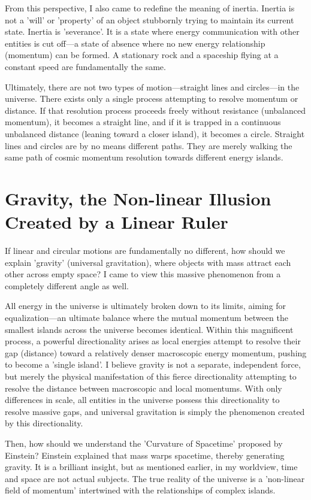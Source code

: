 \documentclass[11pt,a4paper]{article}
\begin{document}
From this perspective, I also came to redefine the meaning of inertia. Inertia is not a 'will' or 'property' of an object stubbornly trying to maintain its current state. Inertia is 'severance'. It is a state where energy communication with other entities is cut off—a state of absence where no new energy relationship (momentum) can be formed. A stationary rock and a spaceship flying at a constant speed are fundamentally the same.

Ultimately, there are not two types of motion—straight lines and circles—in the universe. There exists only a single process attempting to resolve momentum or distance. If that resolution process proceeds freely without resistance (unbalanced momentum), it becomes a straight line, and if it is trapped in a continuous unbalanced distance (leaning toward a closer island), it becomes a circle. Straight lines and circles are by no means different paths. They are merely walking the same path of cosmic momentum resolution towards different energy islands.

\section*{Gravity, the Non-linear Illusion Created by a Linear Ruler}
If linear and circular motions are fundamentally no different, how should we explain 'gravity' (universal gravitation), where objects with mass attract each other across empty space? I came to view this massive phenomenon from a completely different angle as well.

All energy in the universe is ultimately broken down to its limits, aiming for equalization—an ultimate balance where the mutual momentum between the smallest islands across the universe becomes identical. Within this magnificent process, a powerful directionality arises as local energies attempt to resolve their gap (distance) toward a relatively denser macroscopic energy momentum, pushing to become a 'single island'. I believe gravity is not a separate, independent force, but merely the physical manifestation of this fierce directionality attempting to resolve the distance between macroscopic and local momentums. With only differences in scale, all entities in the universe possess this directionality to resolve massive gaps, and universal gravitation is simply the phenomenon created by this directionality.

Then, how should we understand the 'Curvature of Spacetime' proposed by Einstein? Einstein explained that mass warps spacetime, thereby generating gravity. It is a brilliant insight, but as mentioned earlier, in my worldview, time and space are not actual subjects. The true reality of the universe is a 'non-linear field of momentum' intertwined with the relationships of complex islands.
\end{document}
